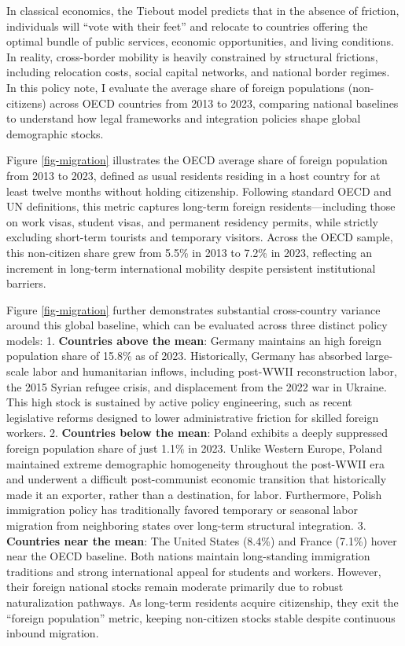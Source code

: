 \documentclass[
  letterpaper,
  DIV=11,
  numbers=noendperiod]{scrartcl}
\begin{document}
In classical economics, the Tiebout model predicts that in the absence
of friction, individuals will ``vote with their feet'' and relocate to
countries offering the optimal bundle of public services, economic
opportunities, and living conditions. In reality, cross-border mobility
is heavily constrained by structural frictions, including relocation
costs, social capital networks, and national border regimes. In this
policy note, I evaluate the average share of foreign populations
(non-citizens) across OECD countries from 2013 to 2023, comparing
national baselines to understand how legal frameworks and integration
policies shape global demographic stocks.

Figure \ref{fig-migration} illustrates the OECD average share of foreign
population from 2013 to 2023, defined as usual residents residing in a
host country for at least twelve months without holding citizenship.
Following standard OECD and UN definitions, this metric captures
long-term foreign residents---including those on work visas, student
visas, and permanent residency permits, while strictly excluding
short-term tourists and temporary visitors. Across the OECD sample, this
non-citizen share grew from 5.5\% in 2013 to 7.2\% in 2023, reflecting
an increment in long-term international mobility despite persistent
institutional barriers.

Figure \ref{fig-migration} further demonstrates substantial
cross-country variance around this global baseline, which can be
evaluated across three distinct policy models: 1.
\textbf{Countries above the mean}: Germany maintains an high foreign
population share of 15.8\% as of 2023. Historically, Germany has
absorbed large-scale labor and humanitarian inflows, including post-WWII
reconstruction labor, the 2015 Syrian refugee crisis, and displacement
from the 2022 war in Ukraine. This high stock is sustained by active
policy engineering, such as recent legislative reforms designed to lower
administrative friction for skilled foreign workers. 2.
\textbf{Countries below the mean}: Poland exhibits a deeply suppressed
foreign population share of just 1.1\% in 2023. Unlike Western Europe,
Poland maintained extreme demographic homogeneity throughout the
post-WWII era and underwent a difficult post-communist economic
transition that historically made it an exporter, rather than a
destination, for labor. Furthermore, Polish immigration policy has
traditionally favored temporary or seasonal labor migration from
neighboring states over long-term structural integration. 3.
\textbf{Countries near the mean}: The United States (8.4\%) and France
(7.1\%) hover near the OECD baseline. Both nations maintain
long-standing immigration traditions and strong international appeal for
students and workers. However, their foreign national stocks remain
moderate primarily due to robust naturalization pathways. As long-term
residents acquire citizenship, they exit the ``foreign population''
metric, keeping non-citizen stocks stable despite continuous inbound
migration.
\end{document}
